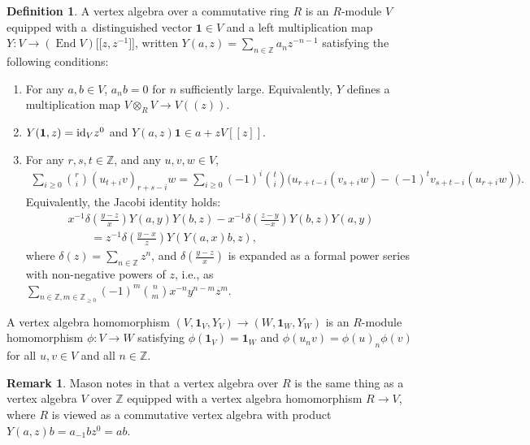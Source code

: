 \documentclass[pdftex]{sigma}
\newcommand{\bZ}{\mathbb{Z}}
\newcommand{\unit}{\mathbf{1}}
\DeclareMathOperator{\End}{End}
\theoremstyle{definition}
\newtheorem{defn}[thm]{Definition}
\newtheorem{rem}[thm]{Remark}
\begin{document}
\begin{defn}
A vertex algebra over a commutative ring $R$ is an $R$-module $V$ equipped with a~distinguished vector $\unit \in V$ and a left multiplication map $Y\colon V \to (\End V)\big[\big[z,z^{-1}\big]\big]$, written $Y(a,z) = \sum\limits_{n \in \bZ} a_n z^{-n-1}$ satisfying the following conditions:
\begin{enumerate}\itemsep=0pt
\item For any $a,b \in V$, $a_n b = 0$ for $n$ sufficiently large. Equivalently, $Y$ defines a multiplication map $V \otimes_{R} V \to V((z))$.
\item $Y(\unit,z) = {\rm id}_V z^0$ and $Y(a,z)\unit \in a + zV[[z]]$.
\item For any $r,s,t \in \bZ$, and any $u,v,w \in V$,
\begin{gather*} \sum_{i \geq 0} \binom{r}{i} (u_{t+i} v)_{r+s-i} w = \sum_{i \geq 0} (-1)^i \binom{t}{i} \big(u_{r+t-i}(v_{s+i}w) - (-1)^t v_{s+t-i}(u_{r+i} w)\big).\end{gather*}
Equivalently, the Jacobi identity holds:
 \begin{gather*}
x^{-1} \delta\left(\frac{y-z}{x}\right) Y(a,y) Y(b,z) - x^{-1} \delta\left(\frac{z-y}{-x}\right) Y(b,z) Y(a,y) \\
\qquad{} = z^{-1} \delta\left(\frac{y-x}{z}\right) Y(Y(a,x)b,z),
\end{gather*}
where $\delta(z) = \sum\limits_{n \in \bZ} z^n$, and $\delta\left(\frac{y-z}{x}\right)$ is expanded as a formal power series with non-negative powers of $z$, i.e., as $\sum\limits_{n \in \bZ, m \in \bZ_{\geq 0}} (-1)^m \binom{n}{m} x^{-n}y^{n-m}z^m$.
\end{enumerate}
A vertex algebra homomorphism $(V, \unit_V, Y_V) \to (W, \unit_W, Y_W)$ is an $R$-module homomorphism $\phi\colon V \to W$ satisfying $\phi(\unit_V) = \unit_W$ and $\phi(u_n v) = \phi(u)_n \phi(v)$ for all $u,v \in V$ and all $n \in \bZ$.
\end{defn}

\begin{rem}
Mason notes in \cite{M17} that a vertex algebra over $R$ is the same thing as a vertex algebra $V$ over $\bZ$ equipped with a vertex algebra homomorphism $R \to V$, where $R$ is viewed as a commutative vertex algebra with product $Y(a,z)b = a_{-1}b z^0 = ab$.
\end{rem}
\end{document}
